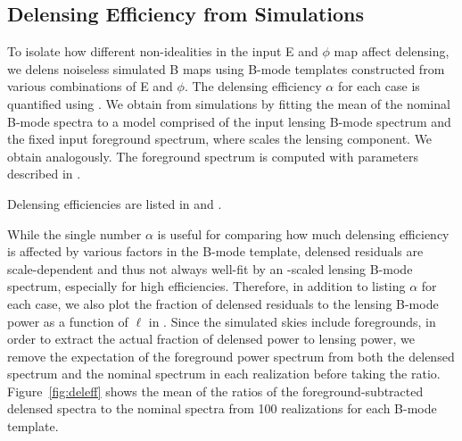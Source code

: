 
\subsection{Delensing Efficiency from Simulations}
To isolate how different non-idealities in the input E and $\phi$ map affect delensing, we delens noiseless simulated B maps using B-mode templates constructed from various combinations of E and $\phi$.
The delensing efficiency $\alpha$ for each case is quantified using .
We obtain \Alens from simulations by fitting the mean of the nominal B-mode spectra to a model comprised of the input lensing B-mode spectrum and the fixed input foreground spectrum, where \Alens scales the lensing component.
We obtain \Ares analogously.
The foreground spectrum is computed with parameters described in .

Delensing efficiencies are listed in  and .

While the single number $\alpha$ is useful for comparing how much delensing efficiency is affected by various factors in the B-mode template,
delensed residuals are scale-dependent and thus not always well-fit by an \Alens-scaled lensing B-mode spectrum, especially for high efficiencies.
Therefore, in addition to listing $\alpha$ for each case, we also plot the fraction of delensed residuals to the lensing B-mode power
as a function of $\ell$ in .
Since the simulated skies include foregrounds, in order to extract the actual fraction of delensed power to lensing power,
we remove the expectation of the foreground power spectrum from both
the delensed spectrum and the nominal spectrum in each realization before taking the ratio.
Figure~\ref{fig:deleff} shows the mean of the ratios of the foreground-subtracted delensed spectra to the nominal spectra from 100 realizations for each B-mode template.


